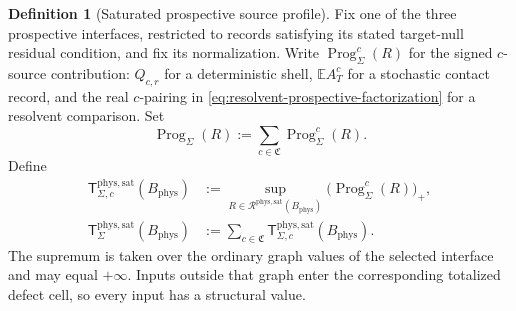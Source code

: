 \documentclass[11pt]{article}
\numberwithin{section}{part}
\theoremstyle{plain}
\theoremstyle{definition}
\newtheorem{definition}[definition]{Definition}
\theoremstyle{remark}
\newcommand{\Channels}{\mathfrak C}
\newcommand{\Records}{\mathscr R}
\newcommand{\Phys}{\mathrm{phys}}
\newcommand{\Sat}{\mathrm{sat}}
\newcommand{\Budget}{B_{\Phys}}
\begin{document}
\begin{definition}[Saturated prospective source profile]
\label{def:saturated-prospective-profile}
Fix one of the three prospective interfaces, restricted to records satisfying
its stated target-null residual condition, and fix its normalization.  Write
\(\operatorname{Prog}_\Sigma^c(R)\) for the signed \(c\)-source contribution:
\(Q_{c,r}\) for a deterministic shell, \(\mathbb E A_T^c\) for a stochastic
contact record, and the real \(c\)-pairing in
\eqref{eq:resolvent-prospective-factorization} for a resolvent comparison.
Set
\begin{equation}
 \label{eq:total-source-progress}
 \operatorname{Prog}_\Sigma(R)
 :=\sum_{c\in\Channels}\operatorname{Prog}_\Sigma^c(R).
\end{equation}
Define
\begin{align}
 \mathsf T_{\Sigma,c}^{\Phys,\Sat}(\Budget)
 &:=\sup_{R\in\Records^{\Phys,\Sat}(\Budget)}
       \bigl(\operatorname{Prog}_\Sigma^c(R)\bigr)_+,
 \label{eq:channel-prospective-profile}\\
 \mathsf T_\Sigma^{\Phys,\Sat}(\Budget)
 &:=\sum_{c\in\Channels}
       \mathsf T_{\Sigma,c}^{\Phys,\Sat}(\Budget).
 \label{eq:total-prospective-profile}
\end{align}
The supremum is taken over the ordinary graph values of the selected
interface and may equal \(+\infty\).  Inputs outside that graph enter the
corresponding totalized defect cell, so every input has a structural value.
\end{definition}
\end{document}
